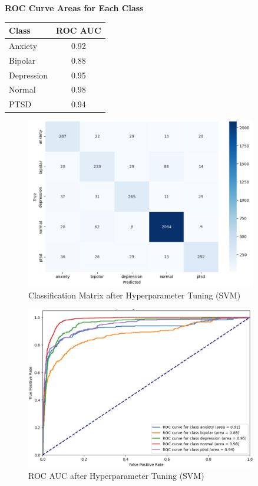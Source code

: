 \begin{center}
    \textbf{ROC Curve Areas for Each Class} \\[0.5em]
    \begin{tabular}{|l|c|}
        \hline
        \textbf{Class}  & \textbf{ROC AUC} \\ \hline
        Anxiety         & 0.92            \\ \hline
        Bipolar         & 0.88            \\ \hline
        Depression      & 0.95            \\ \hline
        Normal          & 0.98            \\ \hline
        PTSD            & 0.94            \\ \hline
    \end{tabular}
\end{center}

\begin{figure}[h!]  
    \centering
    \includegraphics[width=0.9\textwidth]{Images/HP SVM CM.png}  
    \caption{Classification Matrix after Hyperparameter Tuning (SVM)}
    \label{LSTMROC6}  %
\end{figure}

\begin{figure}[h!]  
    \centering
    \includegraphics[width=0.9\textwidth]{Images/HP SVM ROC.png}  
    \caption{ROC AUC after Hyperparameter Tuning (SVM)}
    \label{LSTMROC}  %
\end{figure}

